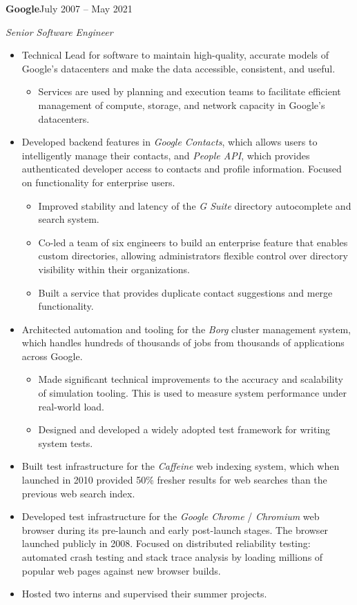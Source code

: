\documentclass[10pt,letterpaper]{article}
\newcommand{\jobheader}[2]{%
  \vspace{3pt}%
  \hspace{1em}\textbf{#1}\hfill#2%
  \vspace{1pt}%
}
\newcommand{\jobtitle}[1]{%
  \par\hspace{1em}\textit{#1}%
  \vspace{2pt}%
}
\begin{document}
\jobheader{Google}{July 2007 -- May 2021}
\jobtitle{Senior Software Engineer}

\begin{itemize}
  \item Technical Lead for software to maintain high-quality, accurate models of Google's datacenters and make the data accessible, consistent, and useful.
    \begin{itemize}
      \item Services are used by planning and execution teams to facilitate efficient management of compute, storage, and network capacity in Google's datacenters.
    \end{itemize}
  \item Developed backend features in \textit{Google Contacts}, which allows users to intelligently manage their contacts, and \textit{People API}, which provides authenticated developer access to contacts and profile information. Focused on functionality for enterprise users.
    \begin{itemize}
      \item Improved stability and latency of the \textit{G Suite} directory autocomplete and search system.
      \item Co-led a team of six engineers to build an enterprise feature that enables custom directories, allowing administrators flexible control over directory visibility within their organizations.
      \item Built a service that provides duplicate contact suggestions and merge functionality.
    \end{itemize}
  \item Architected automation and tooling for the \textit{Borg} cluster management system, which handles hundreds of thousands of jobs from thousands of applications across Google.
    \begin{itemize}
      \item Made significant technical improvements to the accuracy and scalability of simulation tooling. This is used to measure system performance under real-world load.
      \item Designed and developed a widely adopted test framework for writing system tests.
    \end{itemize}
  \item Built test infrastructure for the \textit{Caffeine} web indexing system, which when launched in 2010 provided 50\% fresher results for web searches than the previous web search index.
  \item Developed test infrastructure for the \textit{Google Chrome} / \textit{Chromium} web browser during its pre-launch and early post-launch stages. The browser launched publicly in 2008. Focused on distributed reliability testing: automated crash testing and stack trace analysis by loading millions of popular web pages against new browser builds.
  \item Hosted two interns and supervised their summer projects.
\end{itemize}
\end{document}
